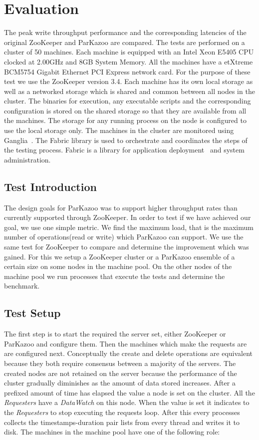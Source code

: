 \chapter{Evaluation}

The peak write throughput performance and the corresponding latencies of the original ZooKeeper and ParKazoo are compared. The tests are performed on a cluster of 50 machines. Each machine is equipped with an Intel\textsuperscript{\textregistered}  Xeon\textsuperscript{\texttrademark}  E5405 CPU clocked at 2.00GHz and 8GB System Memory. All the machines have a etXtreme BCM5754 Gigabit Ethernet PCI Express network card. For the purpose of these test we use the ZooKeeper version 3.4.
Each machine has its own local storage as well as a networked storage which is shared and common between all nodes in the cluster. The binaries for execution, any executable scripts and the corresponding configuration is stored on the shared storage so that they are available from all the machines. The storage for any running process on the node is configured to use the local storage only.
The machines in the cluster are monitored using Ganglia~\cite{sacerdoti2003wide}. The Fabric library is used to orchestrate and coordinates the steps of the testing process. Fabric is a library for application deployment~\cite{spotswood2003systems} and system administration.


\section{Test Introduction}
The design goals for ParKazoo was to support higher throughput rates than currently supported through ZooKeeper. In order to test if we have achieved our goal, we use one simple metric. We find the maximum load, that is the maximum number of operations(read or write) which ParKazoo can support. We use the same test for ZooKeeper to compare and determine the improvement which was gained. For this we setup a ZooKeeper cluster or a ParKazoo ensemble of a certain size on some nodes in the machine pool. On the other nodes of the machine pool we run processes that execute the tests and determine the benchmark.

\section{Test Setup}
The first step is to start the required the server set, either ZooKeeper or ParKazoo and configure them. Then the machines which make the requests are are configured next.  Conceptually the create and delete operations are equivalent because they both require consensus between a majority of the servers. The created nodes are not retained on the server because the performance of the cluster gradually diminishes as the amount of data stored increases. After a prefixed amount of time has elapsed the value a node is set on the cluster. All the \textit{Requesters} have a \textit{DataWatch} on this node. When the value is set it indicates to the \textit{Requesters} to stop executing the requests loop. After this every processes collects the timestamps-duration pair lists from every thread and writes it to disk. 
The machines in the machine pool have one of the following role:
